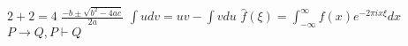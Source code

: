 $2+2=4$
$\frac{-b \pm \sqrt{b^2-4ac}}{2a}$
$\int udv = uv - \int vdu$
$\hat{f}(\xi)= \int_{-\infty}^{\infty} f(x) e^{-2\pi ix\xi} dx$
$P\rightarrow Q, P\vdash Q$
